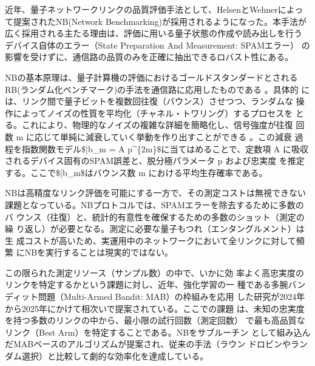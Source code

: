 \documentclass[conference]{IEEEtran}
\begin{document}
近年、量子ネットワークリンクの品質評価手法として、HelsenとWehnerによっ
て提案されたNB(Network Benchmarking)が採用されるようになった。本手法が
広く採用される主たる理由は、評価に用いる量子状態の作成や読み出しを行う
デバイス自体のエラー（State Preparation And Measurement: SPAMエラー）
の影響を受けずに、通信路の品質のみを正確に抽出できるロバスト性にある。


NBの基本原理は、量子計算機の評価におけるゴールドスタンダードとされる
RB(ランダム化ベンチマーク)の手法を通信路に応用したものである 。具体的
には、リンク間で量子ビットを複数回往復（バウンス）させつつ、ランダムな
操作によってノイズの性質を平均化（チャネル・トワリング）するプロセスを
とる。これにより、物理的なノイズの複雑な詳細を簡略化し、信号強度が往復
回数 m に応じて単純に減衰していく挙動を作り出すことができる 。この減衰
過程を指数関数モデル\$\bar{b}\_m = A p\^{}\{2m\}\$に当てはめることで、定数項 A
に吸収されるデバイス固有のSPAM誤差と、脱分極パラメータ p および忠実度
を推定する。ここで\$\bar{b}\_m\$はバウンス数 m における平均生存確率である。


NBは高精度なリンク評価を可能にする一方で、その測定コストは無視できない
課題となっている。NBプロトコルでは、SPAMエラーを除去するために多数のバ
ウンス（往復）と、統計的有意性を確保するための多数のショット（測定の繰
り返し）が必要となる。測定に必要な量子もつれ（エンタングルメント）は生
成コストが高いため、実運用中のネットワークにおいて全リンクに対して頻繁
にNBを実行することは現実的ではない。

この限られた測定リソース（サンプル数）の中で、いかに効
率よく高忠実度のリンクを特定するかという課題に対し、近年、強化学習の一
種である多腕バンディット問題（Multi-Armed Bandit: MAB）の枠組みを応用
した研究が2024年から2025年にかけて相次いで提案されている。ここでの課題
は、未知の忠実度を持つ多数のリンクの中から、最小限の試行回数（測定回数）
で最も高品質なリンク（Best Arm）を特定することである。NBをサブルーチン
として組み込んだMABベースのアルゴリズムが提案され、従来の手法（ラウン
ドロビンやランダム選択）と比較して劇的な効率化を達成している。
\end{document}
